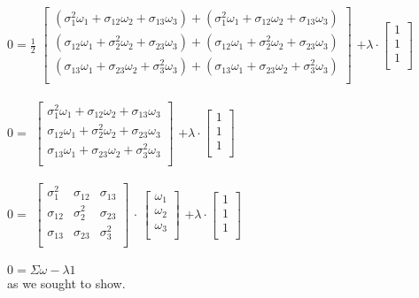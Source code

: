 \documentclass{article}
\begin{document}
{$0 = \frac{1}{2}$
$\begin{bmatrix}
  (\sigma_1^2 \omega_1 + \sigma_{12} \omega_2 + \sigma_{13} \omega_3) + (\sigma_1^2 \omega_1 + \sigma_{12} \omega_2 + \sigma_{13} \omega_3) \\
  (\sigma_{12} \omega_1 + \sigma_2^2 \omega_2 + \sigma_{23} \omega_3) + (\sigma_{12} \omega_1 + \sigma_2^2 \omega_2 + \sigma_{23} \omega_3) \\
  (\sigma_{13} \omega_1 + \sigma_{23} \omega_2 + \sigma_3^2 \omega_3) + (\sigma_{13} \omega_1 + \sigma_{23} \omega_2 + \sigma_3^2 \omega_3)  \\
\end{bmatrix}$
$+ \lambda \cdot
\begin{bmatrix}
  1 \\
  1 \\
  1 \\
\end{bmatrix}$ \\ \\
$0 =$
$\begin{bmatrix}
  \sigma_1^2 \omega_1 + \sigma_{12} \omega_2 + \sigma_{13} \omega_3 \\
  \sigma_{12} \omega_1 + \sigma_2^2 \omega_2 + \sigma_{23} \omega_3 \\
  \sigma_{13} \omega_1 + \sigma_{23} \omega_2 + \sigma_3^2 \omega_3  \\
\end{bmatrix}$
$+ \lambda \cdot
\begin{bmatrix}
  1 \\
  1 \\
  1 \\
\end{bmatrix}$ \\ \\
$0 =$
$\begin{bmatrix}
  \sigma_1^2 & \sigma_{12} & \sigma_{13} \\
  \sigma_{12} & \sigma_2^2 & \sigma_{23} \\
  \sigma_{13} & \sigma_{23} & \sigma_3^2 \\
\end{bmatrix}$
$\cdot$
$\begin{bmatrix}
  \omega_1 \\
  \omega_2 \\
  \omega_3 \\
\end{bmatrix}$ 
$+ \lambda \cdot
\begin{bmatrix}
  1 \\
  1 \\
  1 \\
\end{bmatrix}$ \\ \\
$0 = \Sigma \omega - \lambda 1$ \\
as we sought to show.

}
\end{document}
